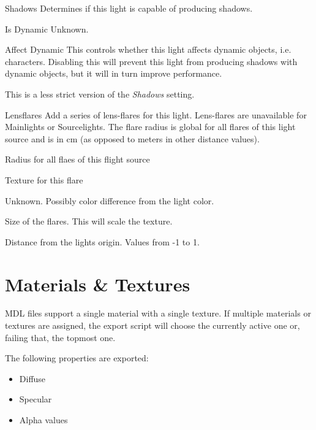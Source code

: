 \begin{propertyAurora}{Shadows}
Determines if this light is capable of producing shadows.
\end{propertyAurora}

\begin{propertyAurora}{Is Dynamic}
Unknown.
\end{propertyAurora}

\begin{propertyAurora}{Affect Dynamic}
This controls whether this light affects dynamic objects, i.e. characters.
Disabling this will prevent this light from producing shadows with dynamic
objects, but it will in turn improve performance.

This is a less strict version of the \textit{Shadows} setting.
\end{propertyAurora}

\begin{propertyAurora}{Lensflares}
Add a series of lens-flares for this light. Lens-flares are unavailable for 
Mainlights or Sourcelights. The flare radius is global for all flares of 
this light source and is in cm (as opposed to meters in other distance values).
\begin{description}[labelindent=\parindent,leftmargin=7em,style=nextline]
    \item[Radius] Radius for all flaes of this flight source
    \item[Texture] Texture for this flare
    \item[Colorshift] Unknown. Possibly color difference from the light color.
    \item[Size] Size of the flares. This will scale the texture.
    \item[Position] Distance from the lights origin. Values from -1 to 1.
\end{description}
\end{propertyAurora}

\section{Materials \& Textures}
MDL files support a single material with a single texture. If multiple 
materials or textures are assigned, the export script will choose the currently 
active one or, failing that, the topmost one.

The following properties are exported:
\begin{itemize}
    \item Diffuse
    \item Specular
    \item Alpha values
\end{itemize}

